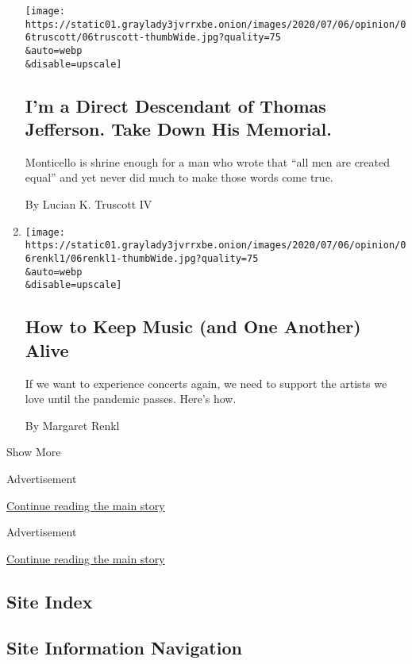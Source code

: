 \begin{enumerate}
  \texttt{[image: https://static01.graylady3jvrrxbe.onion/images/2020/07/06/opinion/06truscott/06truscott-thumbWide.jpg?quality=75\\\&auto=webp\\\&disable=upscale]}

  \hypertarget{im-a-direct-descendant-of-thomas-jefferson-take-down-his-memorial}{%
  \subsection{I'm a Direct Descendant of Thomas Jefferson. Take Down His
  Memorial.}\label{im-a-direct-descendant-of-thomas-jefferson-take-down-his-memorial}}

  Monticello is shrine enough for a man who wrote that ``all men are
  created equal'' and yet never did much to make those words come true.

  By Lucian K. Truscott IV
\item
  \href{/2020/07/05/opinion/coronavirus-chase-rice-country-music.html}{}

  \texttt{[image: https://static01.graylady3jvrrxbe.onion/images/2020/07/06/opinion/06renkl1/06renkl1-thumbWide.jpg?quality=75\\\&auto=webp\\\&disable=upscale]}

  \hypertarget{how-to-keep-music-and-one-another-alive}{%
  \subsection{How to Keep Music (and One Another)
  Alive}\label{how-to-keep-music-and-one-another-alive}}

  If we want to experience concerts again, we need to support the
  artists we love until the pandemic passes. Here's how.

  By Margaret Renkl
\end{enumerate}

Show More

Advertisement

\protect\hyperlink{after-mid1}{Continue reading the main story}

Advertisement

\protect\hyperlink{after-mktg}{Continue reading the main story}

\hypertarget{site-index}{%
\subsection{Site Index}\label{site-index}}

\hypertarget{site-information-navigation}{%
\subsection{Site Information
Navigation}\label{site-information-navigation}}

